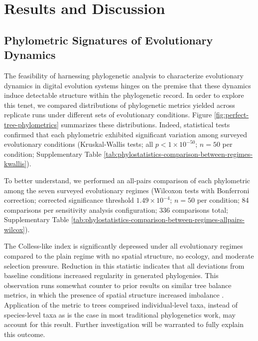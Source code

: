 \section{Results and Discussion}
\label{sec:results}

\subsection{Phylometric Signatures of Evolutionary Dynamics}



The feasibility of harnessing phylogenetic analysis to characterize evolutionary dynamics in digital evolution systems hinges on the premise that these dynamics induce detectable structure within the phylogenetic record.
In order to explore this tenet, we compared distributions of phylogenetic metrics yielded across replicate runs under different sets of evolutionary conditions.
Figure \ref{fig:perfect-tree-phylometrics} summarizes these distributions.
Indeed, statistical tests confirmed that each phylometric exhibited significant variation among surveyed evolutionary conditions (Kruskal-Wallis tests; all $p < 1\times10^{-50}$; $n=50$ per condition; Supplementary Table \ref{tab:phylostatistics-comparison-between-regimes-kwallis}).

To better understand, we performed an all-pairs comparison of each phylometric among the seven surveyed evolutionary regimes (Wilcoxon tests with Bonferroni correction; corrected significance threshold $1.49 \times 10^{-4}$; $n=50$ per condition; 84 comparisons per sensitivity analysis configuration; 336 comparisons total; Supplementary Table \ref{tab:phylostatistics-comparison-between-regimes-allpairs-wilcox}).

The Colless-like index is significantly depressed under all evolutionary regimes compared to the plain regime with no spatial structure, no ecology, and moderate selection pressure.
Reduction in this statistic indicates that all deviations from baseline conditions increased regularity in generated phylogenies.
This observation runs somewhat counter to prior results on similar tree balance metrics, in which the presence of spatial structure increased imbalance \citep{scottInferringTumorProliferative2020}.
Application of the metric to trees comprised individual-level taxa, instead of species-level taxa as is the case in most traditional phylogenetics work, may account for this result.
Further investigation will be warranted to fully explain this outcome.

